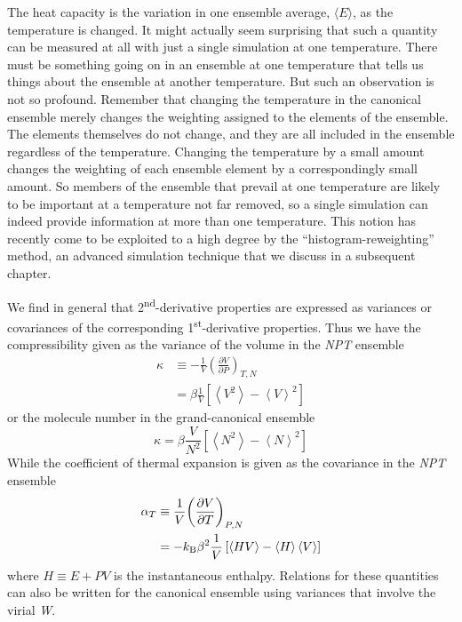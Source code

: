 \documentclass[]{article}
\begin{document}
The heat capacity is the variation in one ensemble average, $\langle E\rangle$, as the
temperature is changed. It might actually seem surprising that such a
quantity can be measured at all with just a single simulation at one
temperature. There must be something going on in an ensemble at one
temperature that tells us things about the ensemble at another
temperature. But such an observation is not so profound. Remember that
changing the temperature in the canonical ensemble merely changes the
weighting assigned to the elements of the ensemble. The elements
themselves do not change, and they are all included in the ensemble
regardless of the temperature. Changing the temperature by a small
amount changes the weighting of each ensemble element by a
correspondingly small amount. So members of the ensemble that prevail at
one temperature are likely to be important at a temperature not far
removed, so a single simulation can indeed provide information at more
than one temperature. This notion has recently come to be exploited to a
high degree by the ``histogram-reweighting'' method, an advanced
simulation technique that we discuss in a subsequent chapter.

We find in general that 2\textsuperscript{nd}-derivative properties are
expressed as variances or covariances of the corresponding
1\textsuperscript{st}-derivative properties. Thus we have the
compressibility given as the variance of the volume in the \emph{NPT} ensemble
\begin{align*}
\kappa  &\equiv  - \frac{1}{V}{\left( {\frac{{\partial V}}{{\partial P}}} \right)_{T,N}}\\
 &= \beta \frac{1}{V}\left[ {\left\langle {{V^2}} \right\rangle  - {{\left\langle V \right\rangle }^2}} \right]
\end{align*}
or the molecule number in the grand-canonical ensemble
\[\kappa  = \beta \frac{V}{{{N^2}}}\left[ {\left\langle {{N^2}} \right\rangle  - {{\left\langle N \right\rangle }^2}} \right]\]
While the coefficient of thermal expansion is given as the covariance in
the \emph{NPT} ensemble
\begin{align*}
{\alpha _T} &\equiv \frac{1}{V}{\left( {\frac{{\partial V}}{{\partial T}}} \right)_{P,N}}\\
 &=  - k_{\rm B}{\beta ^2}\frac{1}{V}\left[ {\left\langle {HV} \right\rangle  - \left\langle H \right\rangle \left\langle V \right\rangle } \right]
\end{align*}
where $H \equiv E + PV$ is the instantaneous enthalpy. Relations for these quantities can
also be written for the canonical ensemble using variances that involve
the virial \emph{W}.
\end{document}

